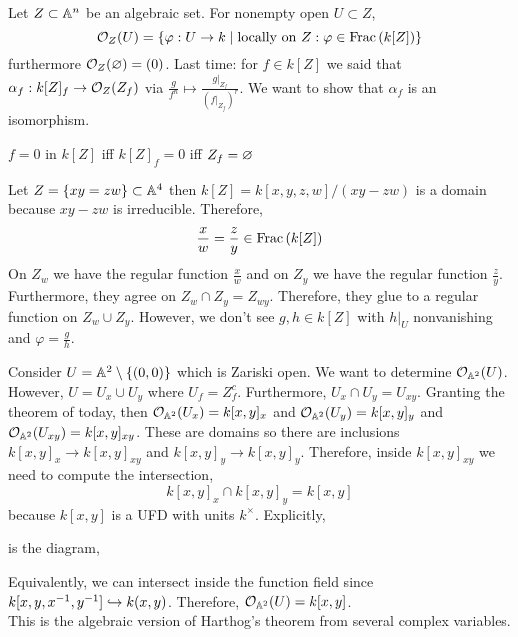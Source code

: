 \documentclass[12pt]{article}
\begin{document}
Let $Z \subset \mathbb{A}^n$ be an algebraic set. For nonempty open $U \subset Z$,
\[ \mathcal{O}_{Z}(U) = \{ \varphi : U \to k \mid \text{locally on } Z : \varphi \in \mathrm{Frac}\left(k[Z]\right) \} \]
furthermore $\mathcal{O}_{Z}(\varnothing) = (0)$. Last time: for $f \in k[Z]$ we said that $\alpha_f : k[Z]_f \to \mathcal{O}_{Z}(Z_f)$ via $\frac{g}{f^n} \mapsto \frac{g|_{Z_f}}{(f|_{Z_f})^r}$. We want to show that $\alpha_f$ is an isomorphism.

\begin{rmk}
$f = 0$ in $k[Z]$ iff $k[Z]_f = 0$ iff $Z_f = \varnothing$
\end{rmk}

\begin{example}

\end{example}
Let $Z = \{ xy = zw \} \subset \mathbb{A}^4$ then $k[Z] = k[x,y,z,w]/(xy - zw)$ is a domain because $xy - zw$ is irreducible. Therefore,
\[ \frac{x}{w} = \frac{z}{y} \in \mathrm{Frac}\left(k[Z]\right) \]
On $Z_w$ we have the regular function $\frac{x}{w}$ and on $Z_y$ we have the regular function $\frac{z}{y}$. Furthermore, they agree on $Z_w \cap Z_y = Z_{wy}$. Therefore, they glue to a regular function on $Z_w \cup Z_y$. However, we don't see $g,h \in k[Z]$ with $h|_U$ nonvanishing and $\varphi = \frac{g}{h}$.

\begin{example}
Consider $U = \mathbb{A}^2 \setminus \{ (0,0) \}$ which is Zariski open. We want to determine $\mathcal{O}_{\mathbb{A}^2}(U)$. However, $U = U_x \cup U_y$ where $U_f = Z_f^c$. Furthermore, $U_x \cap U_y = U_{xy}$. Granting the theorem of today, then $\mathcal{O}_{\mathbb{A}^2}(U_x) = k[x,y]_x$ and $\mathcal{O}_{\mathbb{A}^2}(U_y) = k[x,y]_y$ and $\mathcal{O}_{\mathbb{A}^2}(U_{xy}) = k[x,y]_{xy}$. These are domains so there are inclusions $k[x,y]_x \to k[x,y]_{xy}$ and $k[x,y]_y \to k[x,y]_y$. Therefore, inside $k[x,y]_{xy}$ we need to compute the intersection,
\[ k[x,y]_x \cap k[x,y]_y = k[x,y] \]
because $k[x,y]$ is a UFD with units $k^\times$.
Explicitly,
\begin{center}
\end{center}
is the diagram,
\begin{center}
\end{center}
Equivalently, we can intersect inside the function field since $k[x,y,x^{-1},y^{-1}] \hookrightarrow k(x,y)$. Therefore, $\mathcal{O}_{\mathbb{A}^2}(U) = k[x,y]$. 
\bigskip\\
This is the algebraic version of Harthog's theorem from several complex variables.
\end{example}
\end{document}
